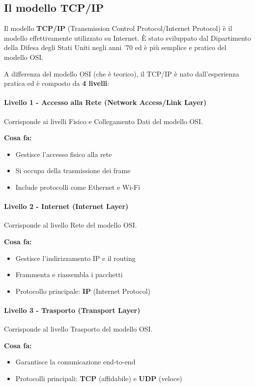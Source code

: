\documentclass[12pt,a4paper]{article}
\begin{document}
\subsection{Il modello TCP/IP}

Il modello \textbf{TCP/IP} (Transmission Control Protocol/Internet Protocol) è il modello effettivamente utilizzato su Internet. È stato sviluppato dal Dipartimento della Difesa degli Stati Uniti negli anni '70 ed è più semplice e pratico del modello OSI.

A differenza del modello OSI (che è teorico), il TCP/IP è nato dall'esperienza pratica ed è composto da \textbf{4 livelli}:

\paragraph{Livello 1 - Accesso alla Rete (Network Access/Link Layer)}
Corrisponde ai livelli Fisico e Collegamento Dati del modello OSI.

\textbf{Cosa fa:}
\begin{itemize}
    \item Gestisce l'accesso fisico alla rete
    \item Si occupa della trasmissione dei frame
    \item Include protocolli come Ethernet e Wi-Fi
\end{itemize}

\paragraph{Livello 2 - Internet (Internet Layer)}
Corrisponde al livello Rete del modello OSI.

\textbf{Cosa fa:}
\begin{itemize}
    \item Gestisce l'indirizzamento IP e il routing
    \item Frammenta e riassembla i pacchetti
    \item Protocollo principale: \textbf{IP} (Internet Protocol)
\end{itemize}

\paragraph{Livello 3 - Trasporto (Transport Layer)}
Corrisponde al livello Trasporto del modello OSI.

\textbf{Cosa fa:}
\begin{itemize}
    \item Garantisce la comunicazione end-to-end
    \item Protocolli principali: \textbf{TCP} (affidabile) e \textbf{UDP} (veloce)
\end{itemize}
\end{document}

